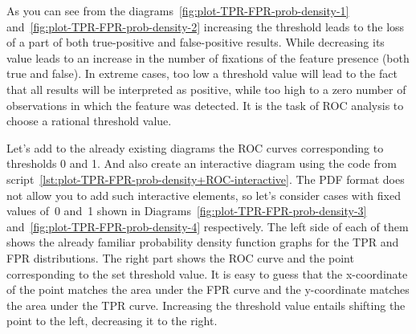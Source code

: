 \documentclass[]{scrreprt}
\begin{document}
As you can see from the diagrams~\ref{fig:plot-TPR-FPR-prob-density-1} and~\ref{fig:plot-TPR-FPR-prob-density-2} increasing the threshold leads to the loss of a part of both true-positive and false-positive results. While decreasing its value leads to an increase in the number of fixations of the feature presence (both true and false). In extreme cases, too low a threshold value will lead to the fact that all results will be interpreted as positive, while too high to a zero number of observations in which the feature was detected. It is the task of ROC analysis to choose a rational threshold value.

Let's add to the already existing diagrams the ROC curves corresponding to thresholds 0 and 1. And also create an interactive diagram using the code from script~\ref{lst:plot-TPR-FPR-prob-density+ROC-interactive}. The PDF format does not allow you to add such interactive elements, so let's consider cases with fixed values of~0 and~1 shown in Diagrams~\ref{fig:plot-TPR-FPR-prob-density-3} and~\ref{fig:plot-TPR-FPR-prob-density-4} respectively. The left side of each of them shows the already familiar probability density function graphs for the TPR and FPR distributions. The right part shows the ROC curve and the point corresponding to the set threshold value. It is easy to guess that the x-coordinate of the point matches the area under the FPR curve and the y-coordinate matches the area under the TPR curve. Increasing the threshold value entails shifting the point to the left, decreasing it to the right.
\end{document}
